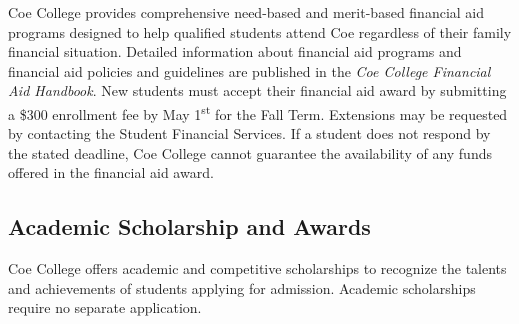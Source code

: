 \documentclass[
  letterpaper,
]{scrbook}
\begin{document}
Coe College provides comprehensive need-based and merit-based financial
aid programs designed to help qualified students attend Coe regardless
of their family financial situation. Detailed information about
financial aid programs and financial aid policies and guidelines are
published in the \emph{Coe College Financial Aid Handbook}. New students
must accept their financial aid award by submitting a \$300 enrollment
fee by May 1\textsuperscript{st} for the Fall Term. Extensions may be
requested by contacting the Student Financial Services. If a student
does not respond by the stated deadline, Coe College cannot guarantee
the availability of any funds offered in the financial aid award.

\subsection{Academic Scholarship and
Awards}\label{academic-scholarship-and-awards}

Coe College offers academic and competitive scholarships to recognize
the talents and achievements of students applying for admission.
Academic scholarships require no separate application.
\end{document}

